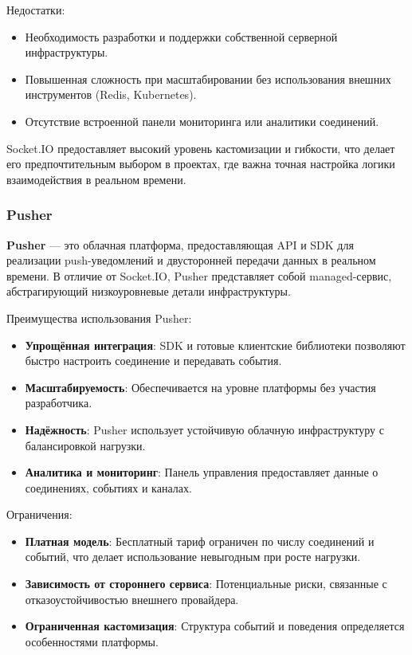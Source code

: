 Недостатки:
\begin{itemize}
    \item Необходимость разработки и поддержки собственной серверной инфраструктуры.
    \item Повышенная сложность при масштабировании без использования внешних инструментов (Redis, Kubernetes).
    \item Отсутствие встроенной панели мониторинга или аналитики соединений.
\end{itemize}

Socket.IO предоставляет высокий уровень кастомизации и гибкости, что делает его предпочтительным выбором в проектах, где важна точная настройка логики взаимодействия в реальном времени.

\subsubsection{Pusher}

\textbf{Pusher} --- это облачная платформа, предоставляющая API и SDK для реализации push-уведомлений и двусторонней передачи данных в реальном времени. В отличие от Socket.IO, Pusher представляет собой managed-сервис, абстрагирующий низкоуровневые детали инфраструктуры.

Преимущества использования Pusher:
\begin{itemize}
    \item \textbf{Упрощённая интеграция}: SDK и готовые клиентские библиотеки позволяют быстро настроить соединение и передавать события.
    \item \textbf{Масштабируемость}: Обеспечивается на уровне платформы без участия разработчика.
    \item \textbf{Надёжность}: Pusher использует устойчивую облачную инфраструктуру с балансировкой нагрузки.
    \item \textbf{Аналитика и мониторинг}: Панель управления предоставляет данные о соединениях, событиях и каналах.
\end{itemize}

Ограничения:
\begin{itemize}
    \item \textbf{Платная модель}: Бесплатный тариф ограничен по числу соединений и событий, что делает использование невыгодным при росте нагрузки.
    \item \textbf{Зависимость от стороннего сервиса}: Потенциальные риски, связанные с отказоустойчивостью внешнего провайдера.
    \item \textbf{Ограниченная кастомизация}: Структура событий и поведения определяется особенностями платформы.
\end{itemize}

